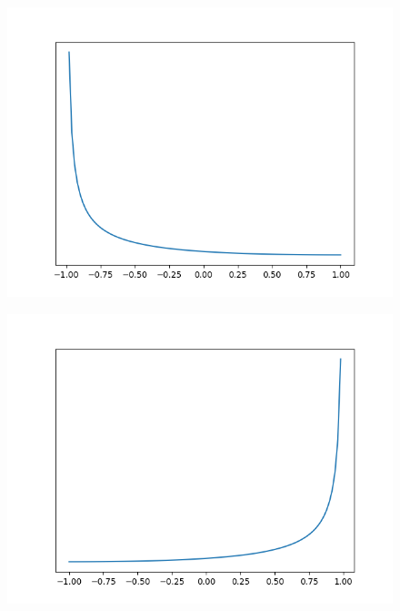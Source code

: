 \begin{figure}[!h]
    \centering
    \includegraphics[scale=0.5]
    {./content/figures/dists/beta_0.3_3}
    \caption{}
    \label{fig:beta-0.3-3}
\end{figure}

\begin{figure}[!h]
    \centering
    \includegraphics[scale=0.5]
    {./content/figures/dists/beta_3_0.3}
    \caption{}
    \label{fig:beta-3-0.3}
\end{figure}

